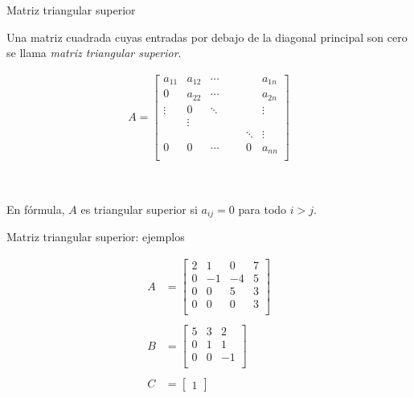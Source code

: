 \documentclass[handout]{beamer} %
\renewcommand{\_}[1]{_{\left[ #1 \right]}}
\renewcommand{\^}[1]{^{\left[ #1 \right]}}
\begin{document}
\begin{frame}{Matriz triangular superior}
    
    Una matriz cuadrada cuyas entradas por debajo de la diagonal principal son cero se llama \textit{matriz triangular superior}.
    
    
    \begin{align*}
        A=
        \left[
        \begin{array}{ccccccc}
            a_{11} & a_{12} & \cdots & & &  & a_{1n}\\ 
            0 & a_{22} & \cdots & & &  & a_{2n}\\
            \vdots & 0 & \ddots & & &  & \vdots\\
            & \vdots &  & & &&  \\
            & &  & & &\ddots& \vdots \\
            0 & 0 & \cdots & & & 0& a_{nn}\\ 
        \end{array}
        \right]
    \end{align*}
    
    \
    
    En fórmula, $A$ es triangular superior si $a_{ij}=0$ para todo $i>j$.
\end{frame}

\begin{frame}{Matriz triangular superior:  ejemplos }
    
    \begin{align*}
        A&=
        \begin{bmatrix}
            2 & 1 & 0 & 7\\ 
            0 & -1 & -4& 5\\
            0&0 & 5 & 3 \\
            0&0& 0 & 3 \\
        \end{bmatrix}
        \\
    &
        \\
        B&=
        \begin{bmatrix}
            5 &  3 & 2\\ 
            0 & 1  & 1\\
            0& 0 & -1 \\
        \end{bmatrix}
        \\
    &
        \\
        C&=
        \begin{bmatrix}
            1
        \end{bmatrix}
    \end{align*}

    \vskip 1cm
\end{frame}
\end{document}
